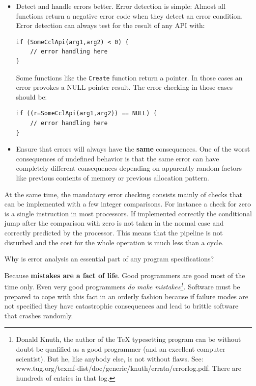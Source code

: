 \begin{itemize}
\item Detect and handle errors better. Error detection is simple: Almost all functions return a negative
error code when they detect an error condition. Error detection can always test for the result
of any API with:
\begin{verbatim}
if (SomeCclApi(arg1,arg2) < 0) {
    // error handling here
}
\end{verbatim}

Some functions like the \verb,Create, function return a pointer. In those cases an error provokes a NULL 
pointer result. The error checking in those cases should be:
\begin{verbatim}
if ((r=SomeCclApi(arg1,arg2)) == NULL) {
    // error handling here
}
\end{verbatim}
\item Ensure that errors will always have the \textbf{same} consequences. One of the worst consequences of undefined behavior is that the same error can 
have completely different consequences depending on apparently random factors like previous contents of memory or previous allocation pattern.
\end{itemize}

At the same time, the mandatory error checking consists mainly of checks that can be implemented with a few integer comparisons. For instance a check 
for zero is a single instruction in most processors. If implemented correctly the conditional jump after the comparison with zero is not taken in the 
normal case and correctly predicted by the processor. This means that the pipeline is not disturbed and the cost for the whole operation is much less than a cycle.

Why is error analysis an essential part of any program specifications?

Because \textbf{mistakes are a fact of life}. Good programmers are good most of the time only. Even very good programmers \textsl{do make mistakes\footnote{Donald Knuth, the author of the TeX typesetting program can be without doubt be qualified as a good programmer (and an excellent computer scientist). But he, like anybody else, is not without flaws. See: 
www.tug.org/texmf-dist/doc/generic/knuth/errata/errorlog.pdf. There are hundreds of entries in that log.}.} Software
must be prepared to cope with this fact in an orderly fashion because if failure modes are not specified they have catastrophic consequences and lead
to brittle software that crashes randomly.

